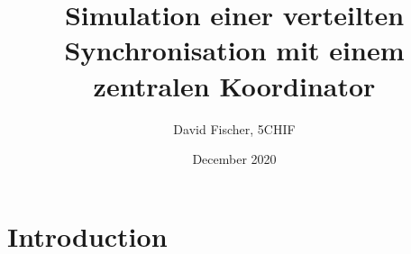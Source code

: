 \documentclass[12pt, letterpaper]{article}
\title{Simulation einer verteilten Synchronisation mit einem zentralen Koordinator}
\author{David Fischer, 5CHIF}
\date{December 2020}
\begin{document}
\begin{titlepage}
\maketitle
\end{titlepage}

\tableofcontents
\newpage

\section{Introduction}
\end{document}
